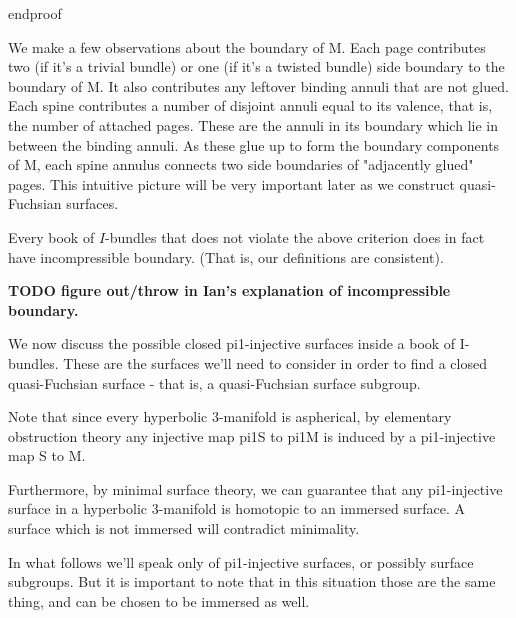 endproof

We make a few observations about the boundary of M. Each page contributes two
(if it's a trivial bundle) or one (if it's a twisted bundle) side boundary to
the boundary of M. It also contributes any leftover binding annuli that are not
glued. Each spine contributes a number of disjoint annuli equal to its valence,
that is, the number of attached pages. These are the annuli in its boundary
which lie in between the binding annuli. As these glue up to form the boundary
components of M, each spine annulus connects two side boundaries of "adjacently
glued" pages. This intuitive picture will be very important later as we
construct quasi-Fuchsian surfaces.


\begin{prop}

Every book of $I$-bundles that does not violate the above criterion does in
fact have incompressible boundary. (That is, our definitions are consistent).


\end{prop}

\textbf{TODO figure out/throw in Ian's explanation of incompressible boundary.}

We now discuss the possible closed pi1-injective surfaces inside a book of
I-bundles. These are the surfaces we'll need to consider in order to find
a closed quasi-Fuchsian surface - that is, a quasi-Fuchsian surface subgroup.

Note that since every hyperbolic 3-manifold is aspherical, by elementary
obstruction theory any injective map pi1S to pi1M is induced by a pi1-injective
map S to M.

Furthermore, by minimal surface theory, we can guarantee that any pi1-injective
surface in a hyperbolic 3-manifold is homotopic to an immersed surface.
A surface which is not immersed will contradict minimality.

In what follows we'll speak only of pi1-injective surfaces, or possibly surface
subgroups. But it is important to note that in this situation those are the
same thing, and can be chosen to be immersed as well.

